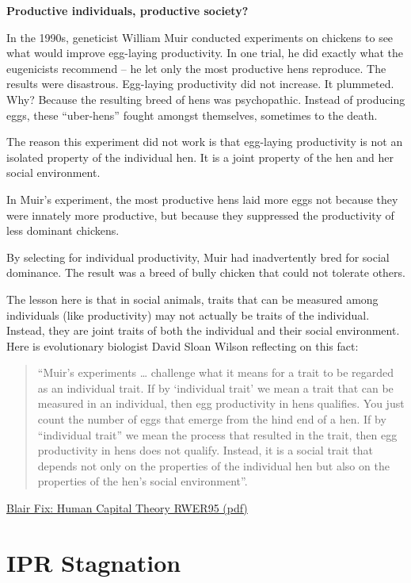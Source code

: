 \documentclass[
]{book}
\begin{document}
\textbf{Productive individuals, productive society?}

In the 1990s, geneticist William Muir conducted experiments on chickens to see what would
improve egg-laying productivity.
In one trial, he did exactly what the eugenicists recommend -- he let only the most productive hens
reproduce. The results were disastrous. Egg-laying productivity did not increase.
It plummeted. Why? Because the resulting breed of hens was psychopathic.
Instead of producing eggs, these ``uber-hens'' fought amongst themselves, sometimes to the death.

The reason this experiment did not work is that egg-laying productivity is not an isolated
property of the individual hen.
It is a joint property of the hen and her social environment.

In Muir's experiment, the most productive hens laid more eggs not because they were innately
more productive, but because they suppressed the productivity of less dominant chickens.

By selecting for individual productivity, Muir had inadvertently bred for social dominance.
The result was a breed of bully chicken that could not tolerate others.

The lesson here is that in social animals, traits that can be measured among individuals (like
productivity) may not actually be traits of the individual.
Instead, they are joint traits of both the individual and their social environment.
Here is evolutionary biologist David Sloan Wilson reflecting on this fact:

\begin{quote}
``Muir's experiments \ldots{} challenge what it means for a trait to be regarded as
an individual trait. If by `individual trait' we mean a trait that can be measured
in an individual, then egg productivity in hens qualifies. You just count the
number of eggs that emerge from the hind end of a hen. If by ``individual trait''
we mean the process that resulted in the trait, then egg productivity in hens
does not qualify. Instead, it is a social trait that depends not only on the
properties of the individual hen but also on the properties of the hen's social
environment''.
\end{quote}

\href{pdf/Fix_2021_Human_Capital_RWER95.pdf}{Blair Fix: Human Capital Theory RWER95 (pdf)}

\hypertarget{ipr-stagnation}{%
\section{IPR Stagnation}\label{ipr-stagnation}}
\end{document}
